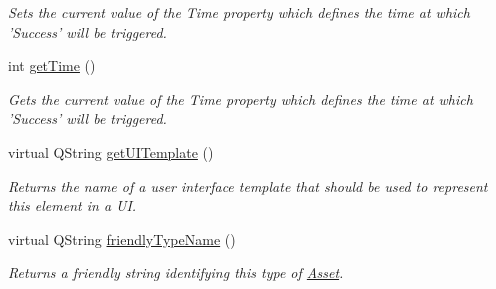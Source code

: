 \begin{DoxyCompactItemize}
\begin{DoxyCompactList}\small\item\em Sets the current value of the Time property which defines the time at which 'Success' will be triggered. \end{DoxyCompactList}\item 
\hypertarget{class_picto_1_1_stopwatch_controller_a76a4c842c3654e41e56299b72265f045}{int \hyperlink{class_picto_1_1_stopwatch_controller_a76a4c842c3654e41e56299b72265f045}{get\-Time} ()}\label{class_picto_1_1_stopwatch_controller_a76a4c842c3654e41e56299b72265f045}

\begin{DoxyCompactList}\small\item\em Gets the current value of the Time property which defines the time at which 'Success' will be triggered. \end{DoxyCompactList}\item 
\hypertarget{class_picto_1_1_stopwatch_controller_a916e02b165773be2942f8bc738193b13}{virtual Q\-String \hyperlink{class_picto_1_1_stopwatch_controller_a916e02b165773be2942f8bc738193b13}{get\-U\-I\-Template} ()}\label{class_picto_1_1_stopwatch_controller_a916e02b165773be2942f8bc738193b13}

\begin{DoxyCompactList}\small\item\em Returns the name of a user interface template that should be used to represent this element in a U\-I. \end{DoxyCompactList}\item 
virtual Q\-String \hyperlink{class_picto_1_1_stopwatch_controller_a34394665524759705fefcc001ea68dba}{friendly\-Type\-Name} ()
\begin{DoxyCompactList}\small\item\em Returns a friendly string identifying this type of \hyperlink{class_picto_1_1_asset}{Asset}. \end{DoxyCompactList}\end{DoxyCompactItemize}
